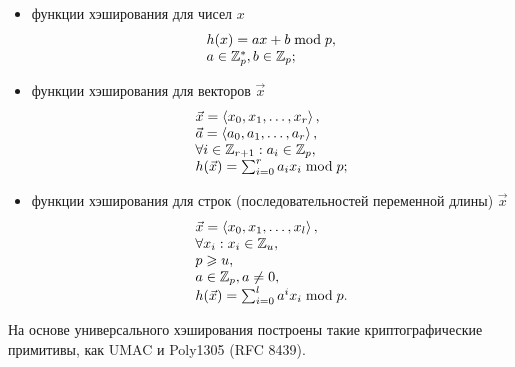 \begin{itemize}
    \item функции хэширования для чисел $x$
    \[ \begin{array}{l}
    h(x) = ax + b \bmod p,\\
    a \in \mathbb{Z}^*_p, b \in \mathbb{Z}_p;\\
    \end{array} \]
    \item функции хэширования для векторов $\vec{x}$
    \[ \begin{array}{l}
    \vec{x} = \left \langle x_0, x_1, \dots, x_r \right \rangle,\\
    \vec{a} = \left \langle a_0, a_1, \dots, a_r \right \rangle,\\
    \forall i \in \mathbb{Z}_{r+1}: a_i \in \mathbb{Z}_{p},\\
    h( \vec{x} ) = \sum_{i=0}^{r} a_i x_i \bmod p;\\
    \end{array} \]
    \item функции хэширования для строк (последовательностей переменной длины) $\vec{x}$
    \[ \begin{array}{l}
    \vec{x} = \left \langle x_0, x_1, \dots, x_l \right \rangle,\\
    \forall x_i: x_i \in \mathbb{Z}_{u}, \\
    p \geqslant u, \\
    a \in \mathbb{Z}_{p}, a \neq 0,\\
    h( \vec{x} ) = \sum_{i=0}^{l} a^{i} x_i \bmod p.\\
    \end{array} \]
\end{itemize}

На основе универсального хэширования построены такие криптографические примитивы, как UMAC и Poly1305 (RFC 8439).
